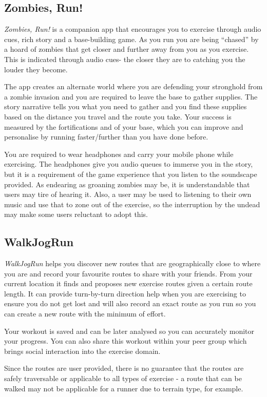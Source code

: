 \subsection{Zombies, Run!}
\label{sec:zombies}
\emph{Zombies, Run!} is a companion app that encourages you to exercise through
audio cues, rich story and a base-building game. As you run you are
being ``chased'' by a hoard of zombies that get closer and further
away from you as you exercise. This is indicated through audio cues-
the closer they are to catching you the louder they become. 

The app creates an alternate world where you are defending your
stronghold from a zombie invasion and you are required to leave the
base to gather supplies. The story narrative tells you what you need
to gather and you find these supplies based on the distance you travel
and the route you take. Your success is measured by the fortifications
and of your base, which you can improve and personalise by running
faster/further than you have done before. 

You are required to wear headphones and carry your mobile phone while
exercising. The headphones give you audio queues to immerse you in the
story, but it is a requirement of the game experience that you listen
to the soundscape provided. As endearing as groaning zombies may be,
it is understandable that users may tire of hearing it. Also, a user
may be used to listening to their own music and use that to zone out
of the exercise, so the interruption by the undead may make some users
reluctant to adopt this.


\subsection{WalkJogRun}
\label{sec:walkjogrun}
\emph{WalkJogRun} helps you discover new routes that are geographically
close to where you are and record your favourite routes to share with
your friends. From your current location it finds and
proposes new exercise routes given a certain route length. It can
provide turn-by-turn direction help when you are exercising to ensure
you do not get lost and will also record an exact route as you run so
you can create a new route with the minimum of effort. 

Your workout is saved and can be later analysed so you can accurately
monitor your progress. You can also share this workout within your
peer group which brings social interaction into the exercise domain.

Since the routes are user provided, there is no guarantee that the
routes are safely traversable or applicable to all types of exercise -
a route that can be walked may not be applicable for a runner due to
terrain type, for example. 

